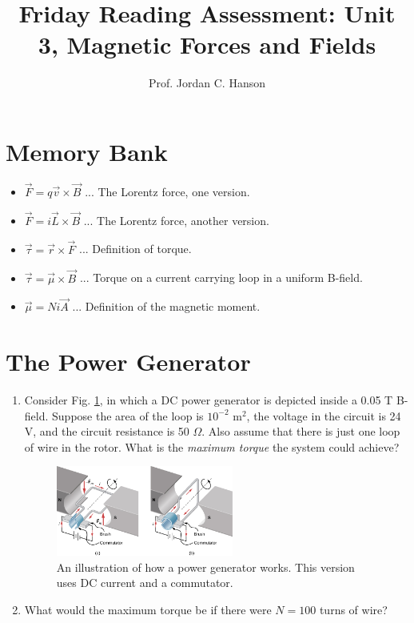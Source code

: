 \documentclass{article}
\begin{document}
\title{Friday Reading Assessment: Unit 3, Magnetic Forces and Fields}
\author{Prof. Jordan C. Hanson}

\maketitle

\section{Memory Bank}

\begin{itemize}
\item $\vec{F} = q\vec{v} \times \vec{B}$ ... The Lorentz force, one version.
\item $\vec{F} = i\vec{L} \times \vec{B}$ ... The Lorentz force, another version.
\item $\vec{\tau} = \vec{r} \times \vec{F}$ ... Definition of torque.
\item $\vec{\tau} = \vec{\mu} \times \vec{B}$ ... Torque on a current carrying loop in a uniform B-field.
\item $\vec{\mu} = Ni\vec{A}$ ... Definition of the magnetic moment.
\end{itemize}

\section{The Power Generator}

\begin{enumerate}
\item Consider Fig. \ref{fig:lorentz}, in which a DC power generator is depicted inside a 0.05 T B-field.  Suppose the area of the loop is $10^{-2}$ m$^{2}$, the voltage in the circuit is 24 V, and the circuit resistance is 50 $\Omega$.  Also assume that there is just one loop of wire in the rotor.  What is the \textit{maximum torque} the system could achieve? \\ \vspace{2cm}
\begin{figure}[ht]
\centering
\includegraphics[width=0.55\textwidth]{commute.jpeg}
\caption{\label{fig:lorentz} An illustration of how a power generator works.  This version uses DC current and a commutator.}
\end{figure}
\item What would the maximum torque be if there were $N = 100$ turns of wire?
\end{enumerate}
\end{document}
